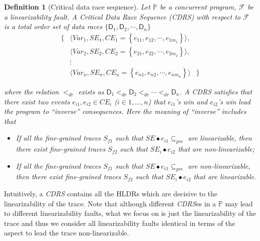 \documentclass[runningheads]{llncs}
\newcommand{\set}[1]{\left\{{#1}\right\}}
\newcommand{\dr}{\mathsf{D}}
\newtheorem{myDef}{Definition}
\begin{document}
\begin{myDef}[Critical data race sequence]\label{def:cdrs}
    Let  $\mathbb{P}$ be a concurrent program, $\mathcal{F}$ be a linearizability fault. A \textit{Critical Data Race Sequence} (\textit{CDRS}) with respect to
 $\mathcal{F}$ is a total order set of data races $\{\mathsf{D}_1,\mathsf{D}_2,\cdots,\mathsf{D}_n\}$
 \[
\begin{array}{ccc}
   \{& \langle\mathit{Var}_1, \mathit{SE}_1, \mathit{CE}_1 = \set{e_{11},e_{12},\cdots,e_{1m_1}}\rangle, & \\
   & \langle\mathit{Var}_2, \mathit{SE}_2, \mathit{CE}_2 = \set{e_{21},e_{22},\cdots,e_{2m_2}}\rangle, &\\
   & \vdots& \\
   &\langle \mathit{Var}_n, \mathit{SE}_n, \mathit{CE}_n = \set{e_{n1},e_{n2},\cdots,e_{nm_n}} \rangle&\}
\end{array}
\]

\noindent where the relation $<_{dr}$ exists as $\mathsf{D}_1 <_{dr} \dr_2 <_{dr} \cdots  <_{dr} \mathsf{D}_n$.
A CDRS satisfies that there exist two events $e_{i1}, e_{i2}\in \mathit{CE}_i$ ($i\in{1,\dots,n}$)   that $e_{i1}$'s win and
$e_{i2}$'s win lead the program to ``inverse'' consequences. Here the meaning of ``inverse'' includes that
\begin{itemize}
\item If all the fine-grained traces $S_{f1}$ such that $\mathit{SE}\bullet e_{i1} \subseteq_{pre}$ are linearizable, then there exist fine-grained traces $S_{f2}$ such that 
$\mathit{SE_i}\bullet e_{i2}$ that are non-linearizable;
\item If all the fine-grained traces $S_{f1}$ such that $\mathit{SE}\bullet e_{i1} \subseteq_{pre}$ are non-linearizable, then there exist fine-grained traces $S_{f2}$ such that 
$\mathit{SE_i}\bullet e_{i2}$ that are linearizable.\\
\end{itemize}
\end{myDef}

\vspace{-0.5cm}
Intuitively, a \textit{CDRS} contains all the HLDRs which are decisive to the linearizability of the trace. Note that although different \textit{CDRS}es in a $\mathbb{P}$ may lead to different linearizability faults, what we focus on is just the linearizability of the trace and thus we consider all linearizability faults identical in terms of the aspect to lead the trace non-linearizable.
\end{document}
